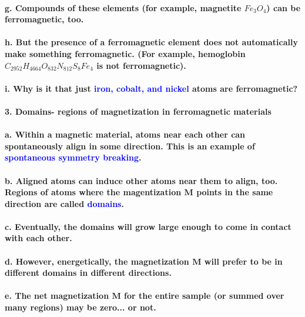 \documentclass{article}
\begin{document}
\paragraph{\indent g. Compounds of these elements (for example, magnetite $Fe_3O_4$) can be ferromagnetic, too.}
\paragraph{\indent h. But the presence of a ferromagnetic element does not automatically make something ferromagnetic. (For example, hemoglobin $C_{2952}H_{4664}O_{832}N_{812}S_8Fe_4$ is not ferromagnetic).}
\paragraph{\indent i. Why is it that just \textcolor{blue}{iron, cobalt, and nickel} atoms are ferromagnetic?}
\paragraph{3. Domains- regions of magnetization in ferromagnetic materials}
\paragraph{\indent a. Within a magnetic material, atoms near each other can spontaneously align in some direction. This is an example of \textcolor{blue}{spontaneous symmetry breaking}.}
\paragraph{\indent b. Aligned atoms can induce other atoms near them to align, too. Regions of atoms where the magentization $\boldsymbol{M}$ points in the same direction are called \textcolor{blue}{domains}.}
\paragraph{\indent c. Eventually, the domains will grow large enough to come in contact with each other.}
\paragraph{\indent d. However, energetically, the magnetization $\boldsymbol{M}$ will prefer to be in different domains in different directions.}
\paragraph{\indent e. The net magnetization $\boldsymbol{M}$ for the entire sample (or summed over many regions) may be zero... or not.}
\end{document}
